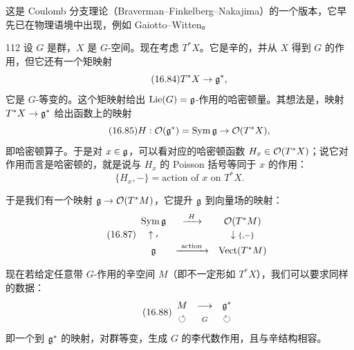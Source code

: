 这是 Coulomb 分支理论（Braverman--Finkelberg--Nakajima）的一个版本，它早先已在物理语境中出现，例如 Gaiotto--Witten。%

\begin{srcex}{112}
设 $G$ 是群，$X$ 是 $G$-空间。现在考虑 $T^*X$。它是辛的，并从 $X$ 得到 $G$ 的作用，但它还有一个矩映射
\begin{equation}\tag{16.84}
T^*X\to\mathfrak{g}^*,
\end{equation}
它是 $G$-等变的。这个矩映射给出 $\mathrm{Lie}(G)=\mathfrak{g}$-作用的哈密顿量。其想法是，映射 $T^*X\to\mathfrak{g}^*$ 给出函数上的映射
\begin{equation}\tag{16.85}
H:\mathcal{O}(\mathfrak{g}^*)=\mathrm{Sym}\,\mathfrak{g}\to\mathcal{O}(T^*X),
\end{equation}
即哈密顿算子。于是对 $x\in\mathfrak{g}$，可以看对应的哈密顿函数 $H_x\in\mathcal{O}(T^*X)$；说它对作用而言是哈密顿的，就是说与 $H_x$ 的 Poisson 括号等同于 $x$ 的作用：
\begin{equation}\tag{16.86}
\{H_x,-\}=\text{action of }x\text{ on }T^*X.
\end{equation}
\end{srcex}

于是我们有一个映射 $\mathfrak{g}\to\mathcal{O}(T^*M)$，它提升 $\mathfrak{g}$ 到向量场的映射：
\begin{equation}\tag{16.87}
\begin{array}{ccc}
\mathrm{Sym}\,\mathfrak{g} & \xrightarrow{\ H\ } & \mathcal{O}(T^*M)\\[2pt]
\uparrow{\scriptstyle\iota} & & \downarrow{\scriptstyle\{,-\}}\\[2pt]
\mathfrak{g} & \xrightarrow{\ \text{action}\ } & \mathrm{Vect}(T^*M)
\end{array}
\end{equation}

现在若给定任意带 $G$-作用的辛空间 $M$（即不一定形如 $T^*X$），我们可以要求同样的数据：
\begin{equation}\tag{16.88}
\begin{array}{ccc}
M & \longrightarrow & \mathfrak{g}^*\\[2pt]
\circlearrowleft & {\scriptstyle G} & \circlearrowright
\end{array}
\end{equation}
即一个到 $\mathfrak{g}^*$ 的映射，对群等变，生成 $G$ 的李代数作用，且与辛结构相容。

